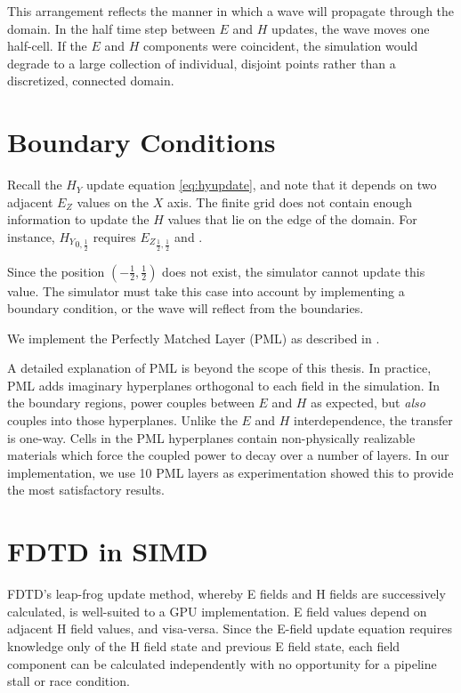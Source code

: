 This arrangement reflects the manner in which a wave will propagate through the domain. In the half time step between $E$ and $H$ updates, the wave moves one half-cell. If the $E$ and $H$ components were coincident, the simulation would degrade to a large collection of individual, disjoint points rather than a discretized, connected domain.


\section{Boundary Conditions}

Recall the $H_Y$ update equation \autoref{eq:hyupdate}, and note that it depends on two adjacent $E_Z$ values on the $X$ axis. The finite grid does not contain enough information to update the $H$ values that lie on the edge of the domain. For instance, ${H_Y}_{0,\frac{1}{2}}$ requires ${E_Z}_{\frac{1}{2},\frac{1}{2}}$ and .

Since the position $(-\frac{1}{2},\frac{1}{2})$ does not exist, the simulator cannot update this value. The simulator must take this case into account by implementing a boundary condition, or the wave will reflect from the boundaries. 

We implement the Perfectly Matched Layer (PML) as described in \cite{BERENGER1994185}. 

A detailed explanation of PML is beyond the scope of this thesis. In practice, PML adds imaginary hyperplanes orthogonal to each field in the simulation. In the boundary regions, power couples between $E$ and $H$ as expected, but \emph{also} couples into those hyperplanes. Unlike the $E$ and $H$ interdependence, the transfer is one-way. Cells in the PML hyperplanes contain non-physically realizable materials which force the coupled power to decay over a number of layers. In our implementation, we use 10 PML layers as experimentation showed this to provide the most satisfactory results.



\section{FDTD in SIMD}

FDTD's leap-frog update method, whereby E fields and H fields are successively calculated, is well-suited to a GPU implementation. E field values depend on adjacent H field values, and visa-versa. Since the E-field update equation requires knowledge only of the H field state and previous E field state, each field component can be calculated independently with no opportunity for a pipeline stall or race condition. 

